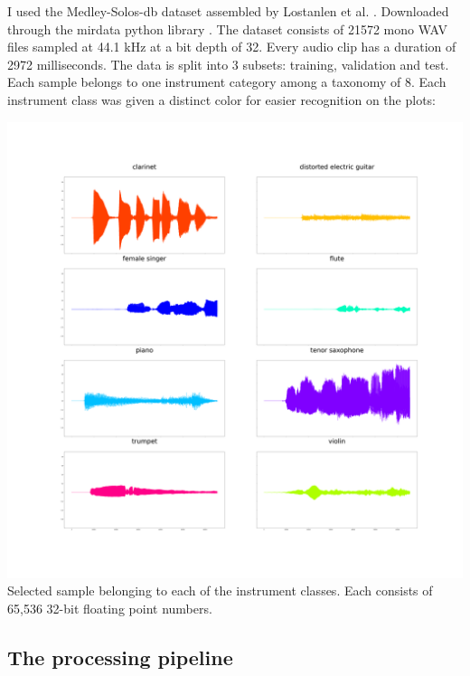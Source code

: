 \documentclass[11pt]{article}
\begin{document}
I used the Medley-Solos-db dataset assembled by Lostanlen et al. \cite{medley,umap}. Downloaded through the mirdata python library \cite{bittner_fuentes_2019}. The dataset consists of 21572 mono WAV files sampled at 44.1 kHz at a bit depth of 32. Every audio clip has a duration of 2972 milliseconds. The data is split into 3 subsets: training, validation and test. Each sample belongs to one instrument category among a taxonomy of 8. Each instrument class was given a distinct color for easier recognition on the plots:
\begin{center}
\includegraphics[width=.9\linewidth]{./Figures/8_samples.png}
Selected sample belonging to each of the instrument classes. Each consists of 65,536 32-bit floating point numbers.
\end{center}

\subsection{The processing pipeline}
\label{sec:org48884fc}
\end{document}

